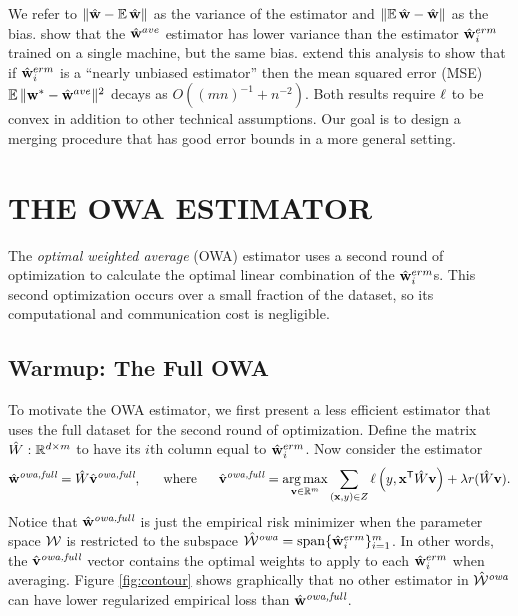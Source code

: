 \documentclass[thesis.tex]{subfiles}
\begin{document}
We refer to ${\lVert {{\hat{\mathbf w}}-\operatorname*{\mathbb E}{\hat{\mathbf w}}} \rVert}$ as the variance of the estimator and ${\lVert {\operatorname*{\mathbb E}{\hat{\mathbf w}}-{\hat{\mathbf w}}} \rVert}$ as the bias.
\citet{mcdonald2009efficient} show that the $\hat{\mathbf w}^{ave}$ estimator has lower variance than the estimator $\hat{\mathbf w}^{erm}_i$ trained on a single machine, but the same bias.
\citet{zhang2012communication} extend this analysis to show that if $\hat{\mathbf w}^{erm}_i$ is a ``nearly unbiased estimator'' then the mean squared error (MSE) $\operatorname*{\mathbb E}{\lVert {{\mathbf w^{*}}-\hat{\mathbf w}^{ave}} \rVert}{}^2$ decays as $O((mn)^{-1} + n^{-2})$.
Both results require $\ell$ to be convex in addition to other technical assumptions.
Our goal is to design a merging procedure that has good error bounds in a more general setting.


\vspace{-0.1in}
\section{THE OWA ESTIMATOR}

\vspace{-0.05in}
The \emph{optimal weighted average} (OWA) estimator uses a second round of optimization to calculate the optimal linear combination of the $\hat{\mathbf w}^{erm}_i$s.
This second optimization occurs over a small fraction of the dataset,
so its computational and communication cost is negligible.

\subsection{Warmup: The Full OWA}

To motivate the OWA estimator,
we first present a less efficient estimator that uses the full dataset for the second round of optimization.
Define the matrix $\hat W : \mathbb{R}^{d\times m}$ to have its $i$th column equal to $\hat{\mathbf w}^{erm}_i$. 
Now consider the estimator
\begin{equation}
\hat{\mathbf w}^{\textit{owa,full}} = \hat W \hat{\mathbf{v}}^{\textit{owa,full}}
,
\text{~~~~~where~~~~~}
\label{eq:vfull}
\hat{\mathbf{v}}^{\textit{owa,full}} = \operatorname*{arg\,max}_{\mathbf{v}\in\mathbb R^m} \sum _{(\mathbf{x},y)\in Z} \ell\left(y,{\mathbf{x}}^{\mathsf{T}} \hat W \mathbf{v} \right)
+
\lambda r(\hat W\mathbf{v})
.
\end{equation}
Notice that $\hat{\mathbf w}^{\textit{owa,full}}$ is just the empirical risk minimizer when the parameter space ${\mathcal W}$ is restricted to the subspace ${\hat {{\mathcal W}}^{\textit{owa}}}=\operatorname*{span}\{\hat{\mathbf w}^{erm}_i\}_{i=1}^m$.
In other words, the $\hat{\mathbf{v}}^{\textit{owa,full}}$ vector contains the optimal weights to apply to each $\hat{\mathbf w}^{erm}_i$ when averaging.
Figure \ref{fig:contour} shows graphically that no other estimator in ${\hat {{\mathcal W}}^{\textit{owa}}}$ can have lower regularized empirical loss than $\hat{\mathbf w}^{\textit{owa,full}}$.
\end{document}
